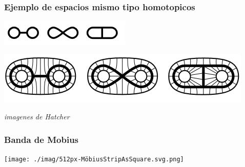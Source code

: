 \documentclass[xetex,mathserif,serif]{beamer}
\begin{document}
  \begin{frame}
    \frametitle{Ejemplo de espacios mismo tipo homotopicos}
    \begin{block}{}
      \centering
      \includegraphics{./imag/ThreeNonHomeoButHomotopyEquivGraphs.png}
    \end{block}

    \begin{block}{}
      \centering
      \includegraphics[scale=0.5]{./imag/HomotopyEquivalentsToBiAnnulus.png}
    \end{block}
    \begin{center}
      \emph{imagenes de Hatcher}
    \end{center}

  \end{frame}

  \begin{frame}
    \frametitle{Banda de Mobius}
    \centering
    \texttt{[image: ./imag/512px-MöbiusStripAsSquare.svg.png]}
  \end{frame}
\end{document}

